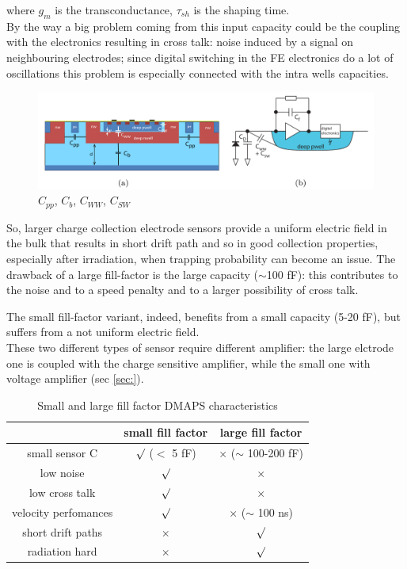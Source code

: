       where $g_m$ is the transconductance, $\tau_{sh}$ is the shaping time. \\
      By the way a big problem coming from this input capacity could be the coupling with the electronics resulting in cross talk: noise induced by a signal on neighbouring electrodes; since digital switching in the FE electronics do a lot of oscillations this problem is especially connected with the intra wells capacities.
      \begin{figure}[h!]
         \centering\includegraphics[width=12cm]{figures/Pixel_detectors/DMAPS_capacity.png}
         \caption{$C_{pp}$, $C_{b}$, $C_{WW}$, $C_{SW}$}
         \label{fig:DMAPS_capacity}
      \end{figure}
      So, larger charge collection electrode sensors provide a uniform electric field in the bulk that results in short drift path and so in good collection properties, especially after irradiation, when trapping probability can become an issue. The drawback of a large fill-factor is the large capacity ($\sim$100 fF): this contributes to the noise and to a speed penalty and to a larger possibility of cross talk.

      The small fill-factor variant, indeed, benefits from a small capacity (5-20 fF), but suffers from a not uniform electric field. \\
      These two different types of sensor require different amplifier: the large elctrode one is coupled with the charge sensitive amplifier, while the small one with voltage amplifier (sec \ref{sec:}).

      \begin{table}
         \begin{center}
         \begin{tabular}{|c | c |c |}
         \hline
         & small fill factor & large fill factor\\
         \hline
         \hline
         small sensor C & $\surd$ ($<$ 5 fF) & $\times$ ($\sim$ 100-200 fF)\\
         low noise & $\surd$ & $\times$\\
         low cross talk & $\surd$ & $\times$ \\
         velocity perfomances & $\surd$ & $\times$ ($\sim$ 100 ns)\\
         short drift paths & $\times$ & $\surd$ \\
         radiation hard & $\times$ & $\surd$ \\
         \hline
         \end{tabular}
         \caption{Small and large fill factor DMAPS characteristics}
         \label{tab:DMAPS_large_small_fillfactor}
         \end{center}
      \end{table}

